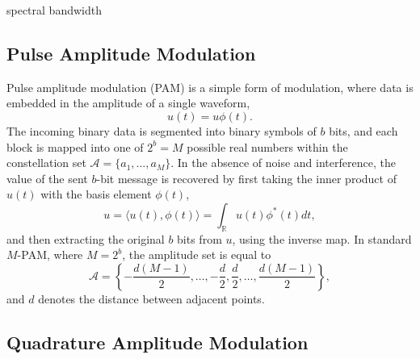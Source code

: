 spectral bandwidth


\newpage

\subsection{Pulse Amplitude Modulation}

Pulse amplitude modulation (PAM) is a simple form of modulation, where data is embedded in the amplitude of a single waveform,
\begin{equation*}
u(t) = u \phi (t) .
\end{equation*}
The incoming binary data is segmented into binary symbols of $b$ bits, and each block is mapped into one of $2^b = M$ possible real numbers within the constellation set $\mathcal{A} = \{ a_1, \ldots, a_M \}$.
In the absence of noise and interference, the value of the sent $b$-bit message is recovered by first taking the inner product of $u(t)$ with the basis element $\phi (t)$,
\begin{equation*}
u = \langle u(t), \phi(t) \rangle = \int_{\mathbb{R}} u(t) \phi^*(t) dt ,
\end{equation*}
and then extracting the original $b$ bits from $u$, using the inverse map.
In standard $M$-PAM, where $M = 2^b$, the amplitude set is equal to
\begin{equation*}
\mathcal{A} = \left\{ - \frac{d(M-1)}{2} , \ldots, - \frac{d}{2}, \frac{d}{2}, \ldots, \frac{d(M-1)}{2} \right\} ,
\end{equation*}
and $d$ denotes the distance between adjacent points.

\subsection{Quadrature Amplitude Modulation}


